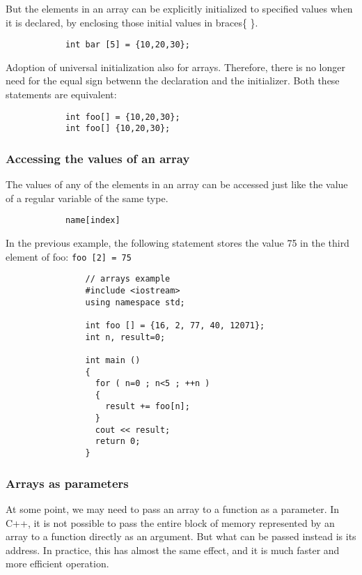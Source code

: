 \documentclass[12pt]{article}
\begin{document}
\begin{itemize}
			But the elements in an array can be explicitly initialized to specified values when it is declared, by enclosing those initial values in braces\{ \}. 

			\begin{verbatim}
			int bar [5] = {10,20,30};
			\end{verbatim}

			Adoption of universal initialization also for arrays. Therefore, there is no longer need for the equal sign betwenn the declaration and the initializer. Both these statements are equivalent: 

			\begin{verbatim}
			int foo[] = {10,20,30};
			int foo[] {10,20,30};
			\end{verbatim}


		\subsubsection{Accessing the values of an array}

			The values of any of the elements in an array can be accessed just like the value of a regular variable of the same type. 

			\begin{verbatim}
			name[index]
			\end{verbatim}

			In the previous example, the following statement stores the value 75 in the third element of foo: \verb|foo [2] = 75|


			\begin{verbatim}
				// arrays example
				#include <iostream>
				using namespace std;

				int foo [] = {16, 2, 77, 40, 12071};
				int n, result=0;

				int main ()
				{
				  for ( n=0 ; n<5 ; ++n )
				  {
				    result += foo[n];
				  }
				  cout << result;
				  return 0;
				}			
			\end{verbatim}

		
		\subsubsection{Arrays as parameters}
			At some point, we may need to pass an array to a function as a parameter. In C++, it is not possible to pass the entire block of memory represented by an array to a function directly as an argument. But what can be passed instead is its address. In practice, this has almost the same effect, and it is much faster and more efficient operation. 


\end{itemize}
\end{document}
